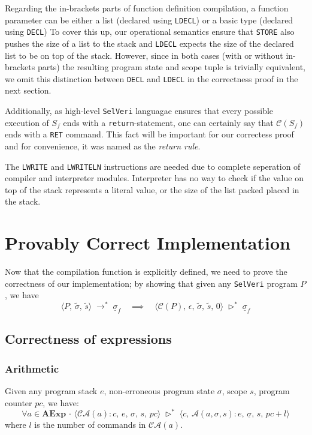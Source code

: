 \documentclass{article}
\begin{document}
Regarding the in-brackets parts of function definition compilation, a function parameter can be either a list (declared using \texttt{LDECL})  or a basic type (declared using \texttt{DECL}) To cover this up, our operational semantics ensure that \texttt{STORE} also pushes the size of a list to the stack and \texttt{LDECL} expects the size of the declared list to be on top of the stack. However, since in both cases (with or without in-brackets parts) the resulting program state and scope tuple is trivially equivalent, we omit this distinction between \texttt{DECL} and \texttt{LDECL} in the correctness proof in the next section.

Additionally, as high-level \texttt{SelVeri} languagae ensures that every possible execution of $S_f$ ends with a \texttt{return}-statement, one can certainly say that $\mathcal{C}(S_f)$ ends with a \texttt{RET} command. This fact will be important for our correctess proof and for convenience, it was named as the \textit{return rule}.

The \texttt{LWRITE} and \texttt{LWRITELN} instructions are needed due to complete seperation of compiler and interpreter modules. Interpreter has no way to check if the value on top of the stack represents a literal value, or the size of the list packed placed in the stack.

\section{Provably Correct Implementation}
Now that the compilation function is explicitly defined, we need to prove the correctness of our implementation; by showing that given any  \texttt{SelVeri} program $P$, we have
\[
\langle P,\, \tilde{\sigma},\, \tilde{s} \rangle \; \rightarrow^{\ast} \; \underline{\sigma}_f \quad \implies \quad 
\langle \mathcal{C}(P),\, \epsilon,\, \tilde{\sigma},\, \tilde{s},\, 0 \rangle \; \triangleright^{\ast} \; \underline{\sigma}_f
\]

\subsection{Correctness of expressions}

\subsubsection{Arithmetic}
Given any program stack $e$, non-erroneous program state $\sigma$, scope $s$, program counter $pc$, we have:
\[
\forall a \in \textbf{AExp} \,\cdot\, \langle \mathcal{CA}(a) : c,\, e,\, \sigma,\, s,\, pc \rangle \; \triangleright^{\ast} \;
\langle c,\, \mathcal{A}(a, \sigma, s) : e,\, \underline{\sigma},\, s,\, pc + l \rangle
\] where $l$ is the number of commands in $\mathcal{CA}(a)$.
\end{document}

